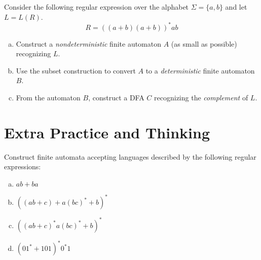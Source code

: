 \documentclass[a4paper,12pt]{amsart}
\begin{document}
\begin{problem}
    
    Consider the following regular expression over the alphabet $\Sigma=\{a,b\}$ and let $L=L(R)$.
    \[
        R=((a + b)(a + b))^*ab
    \]
    \begin{enumerate}[(a)]
        \item Construct a \emph{nondeterministic} finite automaton $A$ (as small as possible) recognizing $L$.
        \item Use the subset construction to convert $A$ to a \emph{deterministic} finite automaton $B$.
        \item From the automaton $B$, construct a DFA $C$ recognizing the \emph{complement} of $L$.
    \end{enumerate}

\end{problem}


\section*{Extra Practice and Thinking}


\medskip\begin{problem}

    Construct finite automata accepting languages described by the following regular expressions:
    
    \begin{multicols}{2}
    
        \begin{enumerate}[(a)]\setlength\itemsep{0pt}
            \item $ab + ba$
            \item $((ab + c)+a(bc)^* + b)^*$
            \item $((ab + c)^*a(bc)^* + b)^*$
            \item $(01^* + 101)^*0^*1$
        \end{enumerate}
    
    \end{multicols}
    
\end{problem}
\end{document}
